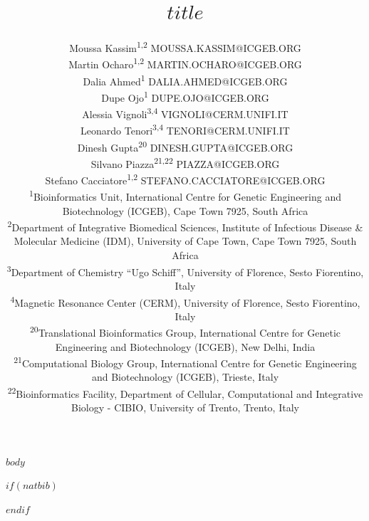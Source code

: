 \documentclass[twoside,11pt]{article}
\begin{document}
\raggedbottom

\title{$title$}

\author{%
\name Moussa Kassim\textsuperscript{1,2} \email MOUSSA.KASSIM@ICGEB.ORG \\
\name Martin Ocharo\textsuperscript{1,2} \email MARTIN.OCHARO@ICGEB.ORG \\
\name Dalia Ahmed\textsuperscript{1} \email DALIA.AHMED@ICGEB.ORG \\
\name Dupe Ojo\textsuperscript{1} \email DUPE.OJO@ICGEB.ORG \\
\name Alessia Vignoli\textsuperscript{3,4} \email VIGNOLI@CERM.UNIFI.IT \\
\name Leonardo Tenori\textsuperscript{3,4} \email TENORI@CERM.UNIFI.IT \\
\name Dinesh Gupta\textsuperscript{20} \email DINESH.GUPTA@ICGEB.ORG \\
\name Silvano Piazza\textsuperscript{21,22} \email PIAZZA@ICGEB.ORG \\
\name Stefano Cacciatore\textsuperscript{1,2} \email STEFANO.CACCIATORE@ICGEB.ORG \\
\addr \textsuperscript{1}Bioinformatics Unit, International Centre for Genetic
Engineering and Biotechnology (ICGEB), Cape Town 7925, South Africa \\
\addr \textsuperscript{2}Department of Integrative Biomedical Sciences,
Institute of Infectious Disease \& Molecular Medicine (IDM), University of Cape
Town, Cape Town 7925, South Africa \\
\addr \textsuperscript{3}Department of Chemistry ``Ugo Schiff'', University of
Florence, Sesto Fiorentino, Italy \\
\addr \textsuperscript{4}Magnetic Resonance Center (CERM), University of Florence,
Sesto Fiorentino, Italy \\
\addr \textsuperscript{20}Translational Bioinformatics Group, International Centre
for Genetic Engineering and Biotechnology (ICGEB), New Delhi, India \\
\addr \textsuperscript{21}Computational Biology Group, International Centre for
Genetic Engineering and Biotechnology (ICGEB), Trieste, Italy \\
\addr \textsuperscript{22}Bioinformatics Facility, Department of Cellular,
Computational and Integrative Biology - CIBIO, University of Trento, Trento, Italy}

\maketitle

$body$

$if(natbib)$

$endif$
\end{document}
